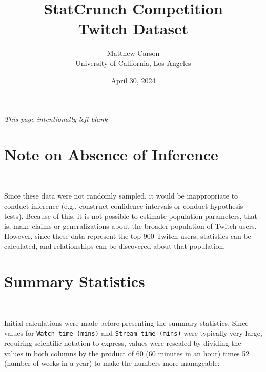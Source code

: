 \documentclass[12pt]{article}
\title{StatCrunch Competition\\ Twitch Dataset}
\author{Matthew Carson\\ University of California, Los Angeles}
\date{April 30, 2024}
\begin{document}
\begin{titlepage}
\maketitle
\thispagestyle{empty} %
\end{titlepage}

\thispagestyle{empty} %

\vspace*{\fill}
\hspace*{\fill}
\begin{center}
    \noindent{}\textit{This page intentionally left blank}
\end{center}
\hspace*{\fill}
\vspace*{\fill}

\newpage

\tableofcontents

\listoftables

\listoffigures
\newpage

\section{Note on Absence of Inference}\

Since these data were not randomly sampled, it would be inappropriate to conduct inference (e.g., construct confidence intervals or conduct hypothesis tests). Because of this, it is not possible to estimate population parameters, that is, make claims or generalizations about the broader population of Twitch users. However, since these data represent the top 900 Twitch users, statistics can be calculated, and relationships can be discovered about that population.

\section{Summary Statistics}\

Initial calculations were made before presenting the summary statistics. Since values for \texttt{Watch time (mins)} and \texttt{Stream time (mins)} were typically very large, requiring scientific notation to express, values were rescaled by dividing the values in both columns by the product of 60 (60 minutes in an hour) times 52 (number of weeks in a year) to make the numbers more manageable:
\end{document}
